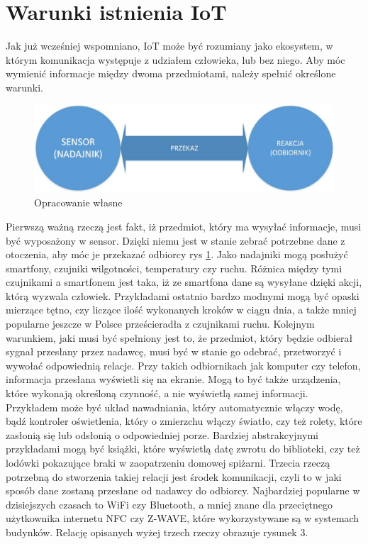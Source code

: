 \documentclass[brudnopis]{xmgr}
\begin{document}
\section{Warunki istnienia IoT}

Jak już wcześniej wspomniano, IoT może być rozumiany jako ekosystem, w którym komunikacja występuje z udziałem człowieka, lub bez niego. Aby móc wymienić informacje między dwoma przedmiotami, należy spełnić określone warunki.
\begin{figure}[h]
\centering
\includegraphics[width=12cm]{o}
\caption{Opracowanie własne}
\label{fig:opracowanie}
\end{figure} 
Pierwszą ważną rzeczą jest fakt, iż przedmiot, który ma wysyłać informacje, musi być wyposażony w sensor. Dzięki niemu jest w stanie zebrać potrzebne dane z otoczenia, aby móc je przekazać odbiorcy rys \ref{fig:opracowanie}. Jako nadajniki mogą posłużyć smartfony, czujniki wilgotności, temperatury czy ruchu. Różnica między tymi czujnikami a smartfonem jest taka, iż ze smartfona dane są wysyłane dzięki akcji, którą wyzwala człowiek. Przykładami ostatnio bardzo modnymi mogą być opaski mierzące tętno, czy liczące ilość wykonanych kroków w ciągu dnia, a także mniej popularne jeszcze w Polsce prześcieradła z czujnikami ruchu. 
Kolejnym warunkiem, jaki musi być spełniony jest to, że przedmiot, który będzie odbierał sygnał przesłany przez nadawcę, musi być w stanie go odebrać, przetworzyć i wywołać odpowiednią relacje. Przy takich odbiornikach jak komputer czy telefon, informacja przesłana wyświetli się na ekranie. Mogą to być także urządzenia, które wykonają określoną czynność, a nie wyświetlą samej informacji. Przykładem może być układ nawadniania, który automatycznie włączy wodę, bądź kontroler oświetlenia, który o zmierzchu włączy światło, czy też rolety, które zasłonią się lub odsłonią o odpowiedniej porze. Bardziej abstrakcyjnymi przykładami mogą być książki, które wyświetlą datę zwrotu do biblioteki, czy też lodówki pokazujące braki w zaopatrzeniu domowej spiżarni.  
Trzecia rzeczą potrzebną do stworzenia takiej relacji jest środek komunikacji, czyli to w jaki sposób dane zostaną przesłane od nadawcy do odbiorcy. Najbardziej popularne w dzisiejszych czasach to WiFi czy Bluetooth, a mniej znane dla przeciętnego użytkownika internetu NFC czy Z-WAVE, które wykorzystywane są w systemach budynków. 
Relację opisanych wyżej trzech rzeczy obrazuje rysunek 3.
\end{document}
